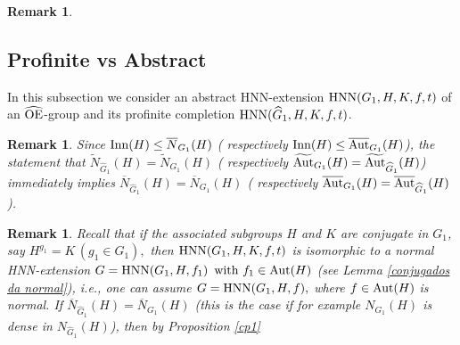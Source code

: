 \documentclass[a4paper,12pt]{article}
\newcommand{\Z}{\mathbb{Z}}
\newcommand{\Oe}{\rm \widehat{OE}}
\def\OE{{\rm OE}}
\def\aut {{\rm Aut}}
\def\inn {{\rm Inn}}
\def\hnn {{\rm HNN}}
\def\Z{{\mathbb Z}}
\newtheorem{rem}[thm]{Remark}
\begin{document}
{\begin{rem}

\end{rem} 



\subsection{Profinite vs Abstract}

In this subsection we consider an abstract HNN-extension $\hnn(G_1,H,K,f,t)$ of an $\Oe$-group and its profinite completion $\hnn(\widehat G_1,H,K,f,t)$. 



\begin{rem} \label{rem dos normalizadores e densidade}
Since $\inn(H)\leq \overline{N}_{G_1}(H)$ ( respectively $\inn(H) \leq \overline{\aut}_{G_1}(H)$), the statement that $\widetilde{N}_{\widehat G_1}(H)=\widetilde{N}_{ G_1}(H) $ ( respectively $\widetilde{\aut}_{G_1}(H) = \widetilde{\aut}_{\widehat G_1}(H)$) immediately implies $\overline{N}_{\widehat G_1}(H)=\overline{N}_{ G_1}(H)$ ( respectively $\overline{\aut}_{G_1}(H) = \overline{\aut}_{\widehat G_1}(H)$).
\end{rem}

\begin{rem} \label{tilde implica overline} Recall that
if the associated subgroups $H$ and $K$ are conjugate in  $G_1$, say $H^{g_1}=K\,(g_1 \in G_1),$ then $\hnn(G_1,H,K,f,t)$ is isomorphic to a normal  HNN-extension $G=\hnn(G_1, H, f_1) \, \mbox{ with } f_1 \in \aut(H)$  (see Lemma \ref{conjugados da normal}), i.e.,  one can assume $G= \hnn(G_1, H, f),$ where $f \in \aut(H)$ is normal.  If $\overline{N}_{\widehat G_1}(H)=\overline{N}_{G_1}(H)$ (this is the case if for example $N_{G_1}(H)$ is dense in $N_{\widehat G_1}(H)$), then by Proposition \ref{cp1} 


\end{rem}}
\end{document}
